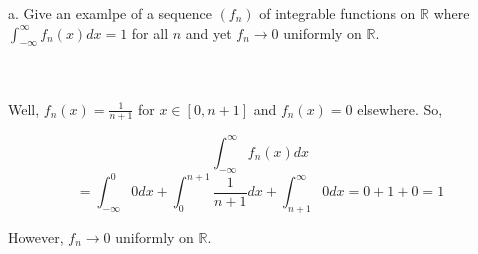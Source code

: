 a. Give an examlpe of a sequence $(f_n)$ of integrable functions on $\mathbb{R}$ where
$\int_{-\infty}^{\infty}f_n(x)dx=1$ for all $n$ and yet $f_n\rightarrow0$ uniformly on $\mathbb{R}$.\\\\

\begin{solution}\renewcommand{\qedsymbol}{}\ \\
    Well, $f_n(x)=\frac{1}{n+1}$ for $x\in[0,n+1]$ and $f_n(x)=0$ elsewhere. So,
    
    $$\int_{-\infty}^{\infty}f_n(x)dx$$
    $$=\int_{-\infty}^{0}0dx+\int_{0}^{n+1}\frac{1}{n+1}dx+\int_{n+1}^{\infty}0dx=0+1+0=1$$
    
    However, $f_n\rightarrow0$ uniformly on $\mathbb{R}$.

\end{solution}